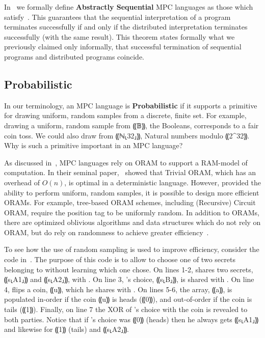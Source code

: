 In~ we formally define \textbf{Abstractly Sequential} MPC languages as those which satisfy~.
This guarantees that the sequential interpretation of a program terminates successfully if and only if the distributed interpretation terminates successfully (with the same
result). This theorem states formally what we previously claimed only informally, that successful termination of sequential programs and distributed programs coincide.

\subsection{Probabilistic}
\label{subsec:background-properties-probabilistic}

In our terminology, an MPC language is \textbf{Probabilistic} if it supports a primitive for drawing uniform, random samples from a
discrete, finite set. For example, drawing a uniform, random sample from ⸨𝔹⸩, the Booleans, corresponds to a fair coin toss. We
could also draw from ⸨ℕ⸤32⸥⸩, Natural numbers modulo ⸨2^{32}⸩. Why is such a primitive important in an MPC language?

As discussed in~, MPC languages rely on ORAM to support a RAM-model of computation. In their seminal paper,~\citet{G87}
showed that Trivial ORAM, which has an overhead of $O(n)$, is optimal in a deterministic language. However, provided the ability
to perform uniform, random samples, it is possible to design more efficient ORAMs. For example, tree-based ORAM schemes, including
(Recursive) Circuit ORAM, require the position tag to be uniformly random. In addition to ORAMs, there are optimized oblivious algorithms
and data structures which do not rely on ORAM, but do rely on randomness to achieve greater efficiency~\cite{obliv-quicksort}.

To see how the use of random sampling is used to improve efficiency, consider the \mpc{} code in~. The purpose of
this code is to allow \bob to choose one of two secrets belonging to \alice without \alice learning which one \bob chose. On lines 1-2,
\alice shares two secrets, ⸨s⸤A1⸥⸩ and ⸨s⸤A2⸥⸩, with \bob. On line 3, \bob's choice, ⸨s⸤B⸥⸩, is shared with \alice.
On line 4, \bob flips a coin, ⸨u⸩, which he shares with \alice. On lines 5-6, the array, ⸨a⸩, is populated
in-order if the coin ⸨u⸩ is heads (⸨0⸩), and out-of-order if the coin is tails (⸨1⸩). Finally, on line 7 the XOR of \bob's choice with the
coin is revealed to both parties. Notice that if \bob's choice was ⸨0⸩ (heads) then he always gets ⸨s⸤A1⸥⸩ and
likewise for ⸨1⸩ (tails) and ⸨s⸤A2⸥⸩.

